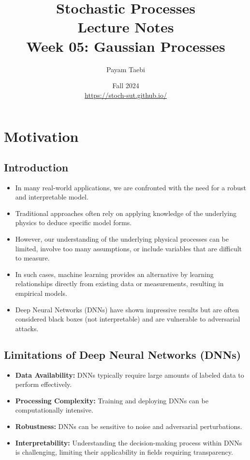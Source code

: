 \documentclass[12pt]{article}
\title{
    \vspace{-2cm}
    \LARGE{Stochastic Processes} \\
    \vspace{0.5cm}
    \Large{Lecture Notes} \\
    \vspace{0.5cm}
    \normalsize{Week 05: Gaussian Processes}
}
\author{
    Payam Taebi \\
    \vspace{0.2cm}
    \normalsize{}
}
\date{
    Fall 2024 \\
    \vspace{0.2cm}
    \href{https://stoch-sut.github.io/}{https://stoch-sut.github.io/}
}
\begin{document}
\maketitle
\tableofcontents
\newpage

\section{Motivation}

\subsection{Introduction}
\begin{itemize}
    \item In many real-world applications, we are confronted with the need for a robust and interpretable model.
    \item Traditional approaches often rely on applying knowledge of the underlying physics to deduce specific model forms.
    \item However, our understanding of the underlying physical processes can be limited, involve too many assumptions, or include variables that are difficult to measure.
    \item In such cases, machine learning provides an alternative by learning relationships directly from existing data or measurements, resulting in empirical models.
    \item Deep Neural Networks (DNNs) have shown impressive results but are often considered black boxes (not interpretable) and are vulnerable to adversarial attacks.
\end{itemize}

\subsection{Limitations of Deep Neural Networks (DNNs)}
\begin{itemize}
    \item \textbf{Data Availability:} DNNs typically require large amounts of labeled data to perform effectively.
    \item \textbf{Processing Complexity:} Training and deploying DNNs can be computationally intensive.
    \item \textbf{Robustness:} DNNs can be sensitive to noise and adversarial perturbations.
    \item \textbf{Interpretability:} Understanding the decision-making process within DNNs is challenging, limiting their applicability in fields requiring transparency.
\end{itemize}
\end{document}
